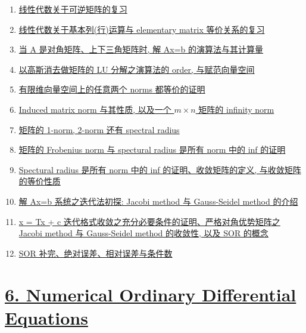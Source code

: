 \documentclass[11pt]{article}
\begin{document}
\begin{enumerate}
	\item \href{https://mp.weixin.qq.com/s/pVb-OJywvIz6iXVjzh6vig}{线性代数关于可逆矩阵的复习} %
	\item \href{https://mp.weixin.qq.com/s/tVrhFFiSb3lMqxbi1NtuPQ}{线性代数关于基本列(行)运算与 elementary matrix 等价关系的复习} %
	\item \href{https://mp.weixin.qq.com/s/_gMsv6Bg5yFdPgodceYzBw}{当 A 是对角矩阵、上下三角矩阵时, 解 Ax=b 的演算法与其计算量} %
	\item \href{https://mp.weixin.qq.com/s/qJPYZxJ7dVLnKVa6IFK-Ig}{以高斯消去做矩阵的 LU 分解之演算法的 order, 与赋范向量空间} %
	\item \href{https://mp.weixin.qq.com/s/ldnKvAuTIuIkU9ULvffhDw}{有限维向量空间上的任意两个 norms 都等价的证明} %
	\item \href{https://mp.weixin.qq.com/s/uFkRKQZkgaxflq7bY7rzNg}{Induced matrix norm 与其性质, 以及一个  $m \times n$ 矩阵的 infinity norm} %
	\item \href{https://mp.weixin.qq.com/s/bHVmE-3p2OKmpdgi9MwfJg}{矩阵的 1-norm, 2-norm 还有 spectral radius} %
	\item \href{https://mp.weixin.qq.com/s/MrSYuZxh-j-vsC7faip1fg}{矩阵的 Frobenius norm 与 spectural radius 是所有 norm 中的 inf 的证明} %
	\item \href{https://mp.weixin.qq.com/s/7PVforjtssKRIXcrG5MtCg}{Spectural radius 是所有 norm 中的 inf 的证明、收敛矩阵的定义, 与收敛矩阵的等价性质} %
	\item \href{https://mp.weixin.qq.com/s/rOGghA6GGYK3NxfmQtgGYQ}{解 Ax=b 系统之迭代法初探: Jacobi method 与 Gauss-Seidel method 的介绍} %
	\item \href{https://mp.weixin.qq.com/s/qqO3dIIXlthHbWmhx9JMPg}{x = Tx + c 迭代格式收敛之充分必要条件的证明、严格对角优势矩阵之 Jacobi method 与 Gauss-Seidel method 的收敛性, 以及 SOR 的概念} %
	\item \href{https://mp.weixin.qq.com/s/-sqCogtHOl6XQFRcMIUDcw}{SOR 补完、绝对误差、相对误差与条件数} %
\end{enumerate}

\vspace{-1cm}

\section*{\href{https://www.youtube.com/playlist?list=PLGwoNNTgFGeg8szzAhG-B2f3KgFpG5G8H}{6. Numerical Ordinary Differential Equations}} %
\end{document}
